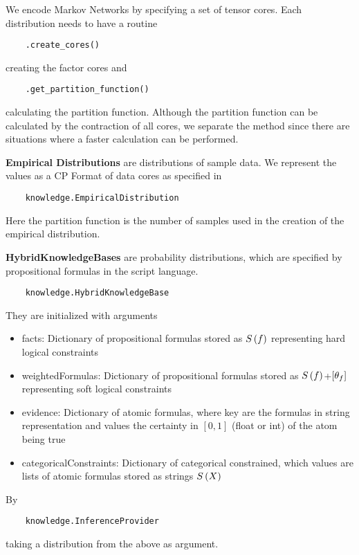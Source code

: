 
We encode Markov Networks by specifying a set of tensor cores.
Each distribution needs to have a routine
\begin{lstlisting}
	.create_cores()
\end{lstlisting}
creating the factor cores and 
\begin{lstlisting}
	.get_partition_function()
\end{lstlisting}
calculating the partition function.
Although the partition function can be calculated by the contraction of all cores, we separate the method since there are situations where a faster calculation can be performed.


\textbf{Empirical Distributions} are distributions of sample data.
We represent the values as a CP Format of data cores as specified in 
\begin{lstlisting}
	knowledge.EmpiricalDistribution
\end{lstlisting}
Here the partition function is the number of samples used in the creation of the empirical distribution.


\textbf{HybridKnowledgeBases} are probability distributions, which are specified by propositional formulas in the script language.
\begin{lstlisting}
	knowledge.HybridKnowledgeBase
\end{lstlisting}
They are initialized with arguments
\begin{itemize}
	\item facts: Dictionary of propositional formulas stored as $S\left(f\right)$ representing hard logical constraints
	\item weightedFormulas: Dictionary of propositional formulas stored as $S\left(f\right)$+$[\theta_{f}]$ representing soft logical constraints
	\item evidence: Dictionary of atomic formulas, where key are the formulas in string representation and values the certainty in $[0,1]$ (float or int) of the atom being true
	\item categoricalConstraints: Dictionary of categorical constrained, which values are lists of atomic formulas stored as strings $S\left(X\right)$
\end{itemize}



By
\begin{lstlisting}
	knowledge.InferenceProvider
\end{lstlisting}
taking a distribution from the above as argument.

